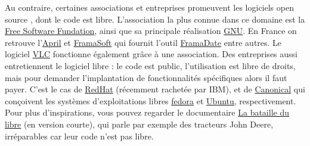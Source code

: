 \documentclass[10pt]{article}
\begin{document}
Au contraire, certaines associations et entreprises promeuvent les logiciels \og open source \fg, dont le code est libre.
L'association la plus connue dans ce domaine est la \href{https://www.fsf.org/}{Free Software Fundation}, ainsi que
sa principale réalisation \href{https://www.gnu.org/}{GNU}. En France on retrouve l'\href{https://www.april.org/}{April} et
\href{https://framasoft.org/fr/}{FramaSoft} qui fournit l'outil \href{https://framadate.org/}{FramaDate} entre autres.
Le logiciel \href{https://www.videolan.org/index.fr.html}{VLC} fonctionne également grâce à une association.
Des entreprises aussi entretiennent le logiciel libre : le code est public, l'utilisation
est libre de droits, mais pour demander l'implantation de fonctionnalités spécifiques alors il faut
payer. C'est le cas de \href{https://www.redhat.com/fr}{RedHat} (récemment rachetée par IBM), et de \href{https://www.canonical.com/}{Canonical}
qui conçoivent les systèmes d'exploitations libres \href{https://getfedora.org/fr/}{fedora} et \href{https://www.ubuntu.com/download}{Ubuntu}, respectivement.
Pour plus d'inspirations, vous pouvez regarder le documentaire \href{https://www.arte.tv/fr/videos/077346-000-A/internet-ou-la-revolution-du-partage/}{La bataille du libre}
(en version courte), qui parle par exemple des tracteurs John Deere, irréparables car leur code n'est pas libre.
\end{document}
